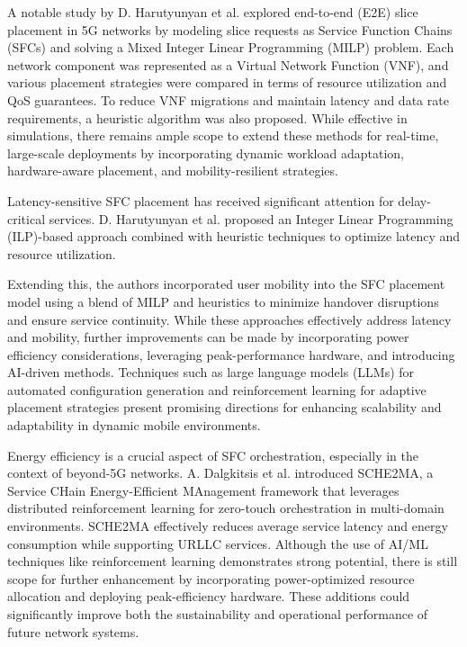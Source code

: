 \documentclass[conference]{IEEEtran}
\begin{document}
A notable study by D. Harutyunyan et al. explored end-to-end (E2E) slice placement in 5G networks by modeling slice requests as Service Function Chains (SFCs) and solving a Mixed Integer Linear Programming (MILP) problem. Each network component was represented as a Virtual Network Function (VNF), and various placement strategies were compared in terms of resource utilization and QoS guarantees. To reduce VNF migrations and maintain latency and data rate requirements, a heuristic algorithm was also proposed. While effective in simulations, there remains ample scope to extend these methods for real-time, large-scale deployments by incorporating dynamic workload adaptation, hardware-aware placement, and mobility-resilient strategies.

Latency-sensitive SFC placement has received significant attention for delay-critical services. D. Harutyunyan et al. proposed an Integer Linear Programming (ILP)-based approach combined with heuristic techniques to optimize latency and resource utilization.

Extending this, the authors incorporated user mobility into the SFC placement model using a blend of MILP and heuristics to minimize handover disruptions and ensure service continuity. While these approaches effectively address latency and mobility, further improvements can be made by incorporating power efficiency considerations, leveraging peak-performance hardware, and introducing AI-driven methods. Techniques such as large language models (LLMs) for automated configuration generation and reinforcement learning for adaptive placement strategies present promising directions for enhancing scalability and adaptability in dynamic mobile environments.


Energy efficiency is a crucial aspect of SFC orchestration, especially in the context of beyond-5G networks. A. Dalgkitsis et al. introduced SCHE2MA, a Service CHain Energy-Efficient MAnagement framework that leverages distributed reinforcement learning for zero-touch orchestration in multi-domain environments. SCHE2MA effectively reduces average service latency and energy consumption while supporting URLLC services. Although the use of AI/ML techniques like reinforcement learning demonstrates strong potential, there is still scope for further enhancement by incorporating power-optimized resource allocation and deploying peak-efficiency hardware. These additions could significantly improve both the sustainability and operational performance of future network systems.
\end{document}

